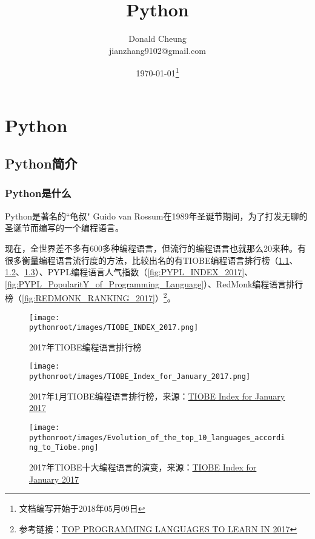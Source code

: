 \ifx\engineeringnotes\undefined
    \providecommand{\notesroot}{../..}
    \providecommand{\pythonroot}{.}

    \title{Python}
    \author{Donald Cheung\\jianzhang9102@gmail.com}
    \date{\today\footnote{文档编写开始于2018年05月09日}}

    
\else
    \providecommand{\pythonroot}{\engineeringroot/Python}
\fi

\chapter{Python}

\section{Python简介}

\subsection{Python是什么}
Python是著名的``龟叔" Guido van Rossum在1989年圣诞节期间，为了打发无聊的圣诞节而编写的一个编程语言。

现在，全世界差不多有600多种编程语言，但流行的编程语言也就那么20来种。有很多衡量编程语言流行度的方法，比较出名的有TIOBE编程语言排行榜（\ref{fig:TIOBE_INDEX_2017}、\ref{fig:TIOBE_Index_for_January_2017}、\ref{fig:TIOBE_Top10_LANGUAGE_EVOLUTION}）、PYPL编程语言人气指数（\ref{fig:PYPL_INDEX_2017}、\ref{fig:PYPL_PopularitY_of_Programming_Language}）、RedMonk编程语言排行榜（\ref{fig:REDMONK_RANKING_2017}）\footnote{参考链接：\href{https://www.codingame.com/blog/top-programming-languages-to-learn-in-2017/}{TOP PROGRAMMING LANGUAGES TO LEARN IN 2017}}。

\begin{figure}[ht]
  \centering
  \texttt{[image: \\pythonroot/images/TIOBE\_INDEX\_2017.png]}
  \caption{2017年TIOBE编程语言排行榜}
  \label{fig:TIOBE_INDEX_2017}
\end{figure}

\begin{figure}[ht]
  \centering
  \texttt{[image: \\pythonroot/images/TIOBE\_Index\_for\_January\_2017.png]}
  \caption{2017年1月TIOBE编程语言排行榜，来源：\href{http://www.tiobe.com/tiobe-index//}{TIOBE Index for January 2017}}
  \label{fig:TIOBE_Index_for_January_2017}
\end{figure}

\begin{figure}[ht]
  \centering
  \texttt{[image: \\pythonroot/images/Evolution\_of\_the\_top\_10\_languages\_according\_to\_Tiobe.png]}
  \caption{2017年TIOBE十大编程语言的演变，来源：\href{http://www.tiobe.com/tiobe-index//}{TIOBE Index for January 2017}}
  \label{fig:TIOBE_Top10_LANGUAGE_EVOLUTION}
\end{figure}

